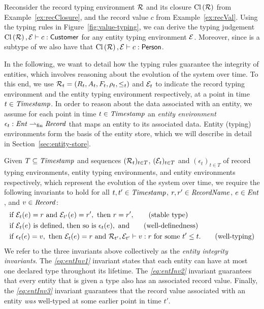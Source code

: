 \begin{example}
  Reconsider the record typing environment ${\mathcal R}$ and its closure
  $\mathrm{Cl}\left({\mathcal R}\right)$ from Example~\ref{ex:recClosure}, and the record
  value $c$ from Example~\ref{ex:recVal}. Using the typing rules in
  Figure~\ref{fig:value-typing}, we can derive the typing judgement
  $\mathrm{Cl}\left({\mathcal R}\right), {\mathcal E} \vdash c : \mathsf{Customer}$ for any
  entity typing environment ${\mathcal E}$. Moreover, since
   is a subtype of  we also
  have that $\mathrm{Cl}\left({\mathcal R}\right), {\mathcal E} \vdash c : \mathsf{Person}$.
\end{example}

In the following, we want to detail how the typing rules guarantee the
integrity of entities, which involves reasoning about the
evolution of the system over time. To this end, we use ${\mathcal R}_t =
(R_t,A_t,F_t,\rho_t,\le_t)$ and ${\mathcal E}_t$ to indicate the record
typing environment and the entity typing environment respectively, at a
point in time $t \in \mathit{Timestamp}$. In order to reason about the data
associated with an entity, we assume for each point in time $t \in
\mathit{Timestamp}$ an \emph{entity environment} $\epsilon_t : \mathit{Ent}
\rightharpoonup_{\mathrm{fin}} \mathit{Record}$ that maps an entity to its associated data. Entity
(typing) environments form the basis of the entity store, which we
will describe in detail in Section~\ref{sec:entity-store}.

Given $T \subseteq \mathit{Timestamp}$ and sequences $({\mathcal R}_t)_{t\in T}$,
$({\mathcal E}_t)_{t\in T}$ and $(\epsilon_t)_{t\in T}$ of record typing
environments, entity typing environments, and entity environments
respectively, which represent the evolution of the system over time,
we require the following invariants to hold for all $t,t' \in
\mathit{Timestamp}$, $r,r' \in \mathit{RecordName}$, $e \in \mathit{Ent}$, and $v \in
\mathit{Record}$:
\begin{align}
  &\text{if } {\mathcal E}_t(e) = r \text { and } {\mathcal E}_{t'}(e) = r', \text{
    then }r = r',
  \tag{stable type}\label{eq:entInv1}\\
  &\text{if } {\mathcal E}_t(e) \text{ is defined, then so is } \epsilon_t(e),
  \text{ and} \tag{well-definedness}\label{eq:entInv2}\\
  &\text{if } \epsilon_t(e) = v, \text{ then } {\mathcal E}_t(e) = r \text{
    and }
  {\mathcal R}_{t'}, {\mathcal E}_{t'} \vdash v : r \text{ for some } t' \le
  t.\tag{well-typing}\label{eq:entInv3}
\end{align}
We refer to the three invariants above collectively as the
\emph{entity integrity invariants}.
The \emph{\ref{eq:entInv1}} invariant states that each entity can have
at most one declared type throughout its lifetime. The
\emph{\ref{eq:entInv2}} invariant guarantees that every entity that is
given a type also has an associated record value. Finally, the
\emph{\ref{eq:entInv3}} invariant guarantees that the record value
associated with an entity \emph{was} well-typed at some earlier point
in time $t'$.

